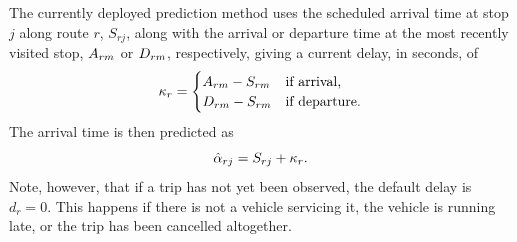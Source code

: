 The currently deployed prediction method uses the scheduled arrival time at stop $j$ along route $r$, $S_{rj}$, along with the arrival or departure time at the most recently visited stop, $A_{rm}$ or $D_{rm}$, respectively, giving a current delay, in seconds, of
\begin{equation}
\label{eq:sched_cur_delay}
\kappa_{r} =
\begin{cases}
A_{rm} - S_{rm} & \text{if arrival,} \\
D_{rm} - S_{rm} & \text{if departure.}
\end{cases}
\end{equation}
The arrival time is then predicted as
\begin{equation}
\label{eq:sched_pred_arr}
\hat{\alpha}_{rj} = S_{rj} + \kappa_r.
\end{equation}
Note, however, that if a trip has not yet been observed, the default delay is $d_r = 0$. This happens if there is not a vehicle servicing it, the vehicle is running late, or the trip has been cancelled altogether.

